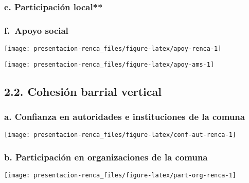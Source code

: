 \documentclass[
]{article}
\begin{document}
\hypertarget{e.-participaciuxf3n-local}{%
\subsubsection{e. Participación
local**}\label{e.-participaciuxf3n-local}}

\hypertarget{f.-apoyo-social}{%
\subsubsection{f.~Apoyo social}\label{f.-apoyo-social}}

\begin{flushleft}\texttt{[image: presentacion-renca\_files/figure-latex/apoy-renca-1]} \end{flushleft}

\begin{flushleft}\texttt{[image: presentacion-renca\_files/figure-latex/apoy-ams-1]} \end{flushleft}

\hypertarget{cohesiuxf3n-barrial-vertical}{%
\subsection{2.2. Cohesión barrial
vertical}\label{cohesiuxf3n-barrial-vertical}}

\hypertarget{a.-confianza-en-autoridades-e-instituciones-de-la-comuna}{%
\subsubsection{a. Confianza en autoridades e instituciones de la
comuna}\label{a.-confianza-en-autoridades-e-instituciones-de-la-comuna}}

\begin{flushleft}\texttt{[image: presentacion-renca\_files/figure-latex/conf-aut-renca-1]} \end{flushleft}

\hypertarget{b.-participaciuxf3n-en-organizaciones-de-la-comuna}{%
\subsubsection{b. Participación en organizaciones de la
comuna}\label{b.-participaciuxf3n-en-organizaciones-de-la-comuna}}

\begin{flushleft}\texttt{[image: presentacion-renca\_files/figure-latex/part-org-renca-1]} \end{flushleft}
\end{document}
